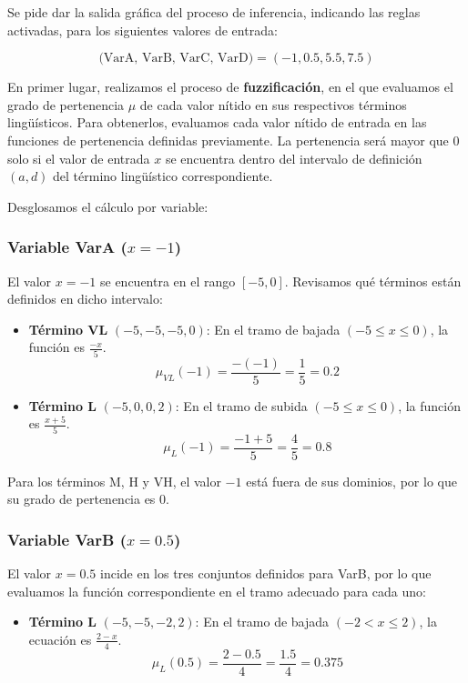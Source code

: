 \documentclass[11pt, a4paper]{article}
\newenvironment{problem}[1][Cuestión]{
	\vspace{0.5cm}
	\noindent{\Large\bfseries #1} \par\vspace{0.5cm}
}{
	\vspace{0.5cm}
}
\begin{document}
	\begin{problem}[Problema 2 (60 \%)]
		Se pide dar la salida gráfica del proceso de inferencia, indicando las reglas activadas, para los siguientes valores de entrada:

		$$\text{(VarA, VarB, VarC, VarD)} = (-1,0.5,5.5,7.5)$$

		{ \color{blue} 
			En primer lugar, realizamos el proceso de \textbf{fuzzificación}, en el que evaluamos el grado de pertenencia $\mu$ de cada valor nítido en sus respectivos términos lingüísticos. Para obtenerlos, evaluamos cada valor nítido de entrada en las funciones de pertenencia definidas previamente. La pertenencia será mayor que $0$ solo si el valor de entrada $x$ se encuentra dentro del intervalo de definición $(a, d)$ del término lingüístico correspondiente.

			Desglosamos el cálculo por variable:

			\subsubsection*{Variable VarA ($x = -1$)}
				El valor $x = -1$ se encuentra en el rango $[-5, 0]$. Revisamos qué términos están definidos en dicho intervalo:

				\begin{itemize}
					\item \textbf{Término VL} $(-5, -5, -5, 0)$: En el tramo de bajada $(-5 \le x \le 0)$, la función es $\frac{-x}{5}$.
						\[ \mu_{VL}(-1) = \frac{-(-1)}{5} = \frac{1}{5} = \mathbf{0.2} \]

					\item \textbf{Término L} $(-5, 0, 0, 2)$: En el tramo de subida $(-5 \le x \le 0)$, la función es $\frac{x+5}{5}$.
						\[ \mu_{L}(-1) = \frac{-1+5}{5} = \frac{4}{5} = \mathbf{0.8} \]
				\end{itemize}

				Para los términos M, H y VH, el valor $-1$ está fuera de sus dominios, por lo que su grado de pertenencia es $0$.

			\subsubsection*{Variable VarB ($x = 0.5$)}
				El valor $x = 0.5$ incide en los tres conjuntos definidos para VarB, por lo que evaluamos la función correspondiente en el tramo adecuado para cada uno:

				\begin{itemize}
					\item \textbf{Término L} $(-5, -5, -2, 2)$: En el tramo de bajada $(-2 < x \le 2)$, la ecuación es $\frac{2-x}{4}$.
						\[ \mu_{L}(0.5) = \frac{2 - 0.5}{4} = \frac{1.5}{4} = \mathbf{0.375} \]


\end{itemize}}
\end{problem}
\end{document}
